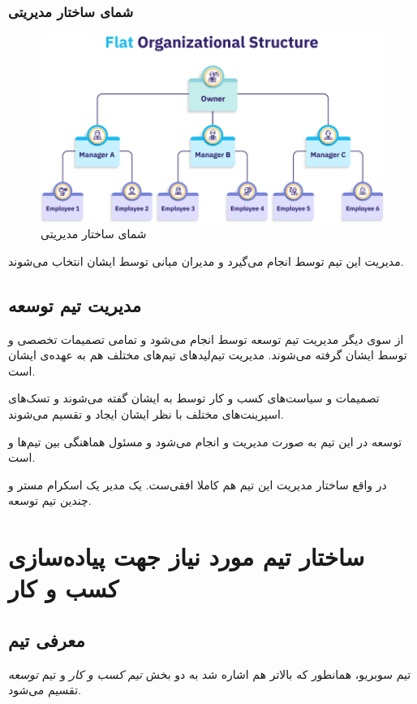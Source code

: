 \documentclass[dvipsnames, svgnames, x11names, 11pt]{article}
\begin{document}
\subsubsection{شمای ساختار مدیریتی}
\begin{figure}[H]
\begin{center}
\includegraphics[scale=0.5]{../images/flat}
\end{center}
\caption{شمای ساختار مدیریتی}
\end{figure}

مدیریت این تیم توسط
انجام می‌گیرد و مدیران میانی توسط ایشان انتخاب می‌شوند.

\subsection{مدیریت تیم توسعه}
از سوی دیگر مدیریت تیم توسعه توسط 
انجام می‌شود و تمامی تصمیمات تخصصی و 
توسط ایشان گرفته می‌شوند. مدیریت تیم‌لید‌های تیم‌های مختلف هم به عهده‌ی ایشان است. 

تصمیمات و سیاست‌های کسب و کار توسط 
به ایشان گفته می‌شوند و تسک‌های اسپرینت‌های مختلف با نظر ایشان ایجاد و تقسیم می‌شوند.

توسعه در این تیم به صورت 
مدیریت و انجام می‌شود و 
مسئول هماهنگی بین تیم‌ها و 
است.

در واقع ساختار مدیریت این تیم هم کاملا افقی‌ست. یک مدیر
یک اسکرام مستر و چندین تیم توسعه.

\section{ساختار تیم مورد نیاز جهت پیاده‌سازی کسب و کار}
\subsection{معرفی تیم}
تیم سوبریو، همانطور که بالاتر هم اشاره شد به دو بخش \textit{تیم کسب و کار} و تیم \textit{توسعه} تقسیم می‌شود. 
\end{document}
